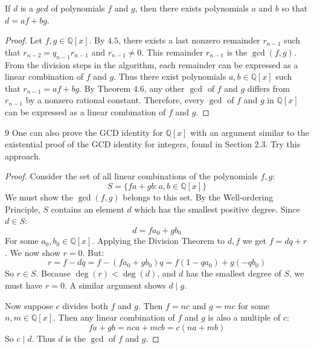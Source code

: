 \begin{theorem}
    If $d$ is a $gcd$  of polynomials $f$ and $g$,
        then there exists polynomials $a$ and $b$
        so that $d = af + bg$.
\end{theorem}

\begin{proof}
    Let $f, g \in \mathbb{Q}[x]$.
    By $4.5$, there exists a last nonzero remainder 
        $r_{n-1}$ such that $r_{n-2} = q_{n-1} r_{n-1}$ and $r_{n-1} \ne 0$.
    This remainder $r_{n-1}$ is the $\gcd(f, g)$.
    From the division steps in the algorithm, each remainder can be expressed 
        as a linear combination of $f$ and $g$.
    Thus there exist polynomials $a, b \in \mathbb{Q}[x]$ such that 
        $r_{n-1} = af + bg$.
    By Theorem $4.6$, any other $\gcd$ of $f$ and $g$ differs from $r_{n-1}$ 
        by a nonzero rational constant.
    Therefore, every $\gcd$ of $f$ and $g$ in $\mathbb{Q}[x]$ can be expressed 
        as a linear combination of $f$ and $g$.
\end{proof}

\begin{problem}{9}
    One can also prove the GCD identity for $\mathbb{Q}[x]$ with an argument 
    similar to the existential proof of the GCD identity for integers,
    found in Section $2.3$. Try this approach.
\end{problem}
\solved

\begin{proof}
    Consider the set of all linear combinations of the polynomials $f, g$:
    \[
    S = \{ f a + g b : a, b \in \mathbb{Q}[x] \}
    \]
    We must show the $\gcd(f, g)$ belongs to this set.
    By the Well-ordering Principle, $S$ contains an element $d$
    which has the smallest positive degree.
    Since $d \in S$:
    \[
    d = f a_0 + g b_0
    \]
    For some $a_0, b_0 \in \mathbb{Q}[x]$.
    Applying the Division Theorem to $d, f$
    we get $f = d q + r$.
    We now show $r = 0$.
    But:
    \[
    r = f - d q = f - (f a_0 + g b_0) q = f (1 - q a_0) + g(-q b_0)
    \]
    So $r \in S$. Because $\deg(r) < \deg(d)$, and $d$ has the smallest degree 
    of $S$, we must have $r = 0$.
    A similar argument shows $d \mid g$.

    Now suppose $c$ divides both $f$ and $g$.
    Then $f = n c$ and $g = m c$ for some $n, m \in \mathbb{Q}[x]$.
    Then any linear combination of $f$ and $g$ is also a multiple of $c$:
    \[
    f a + g b = n c a + m c b = c (n a + m b)
    \]
    So $c \mid d$.
    Thus $d$ is the $\gcd$ of $f$ and $g$.
\end{proof}

